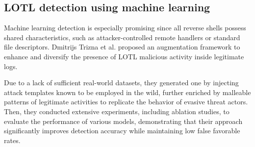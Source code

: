 
\subsection*{LOTL detection using machine learning}

Machine learning detection is especially promising since all reverse shells possess shared characteristics, such as attacker-controlled remote handlers or standard file descriptors. Dmitrijs Trizna et al. proposed an augmentation framework \cite{LOTL} to enhance and diversify the presence of LOTL malicious activity inside legitimate logs.

Due to a lack of sufficient real-world datasets, they generated one by injecting attack templates known to be employed in the wild, further enriched by malleable patterns of legitimate activities to replicate the behavior of evasive threat actors. Then, they conducted extensive experiments, including ablation studies, to evaluate the performance of various models, demonstrating that their approach significantly improves detection accuracy while maintaining low false favorable rates.

